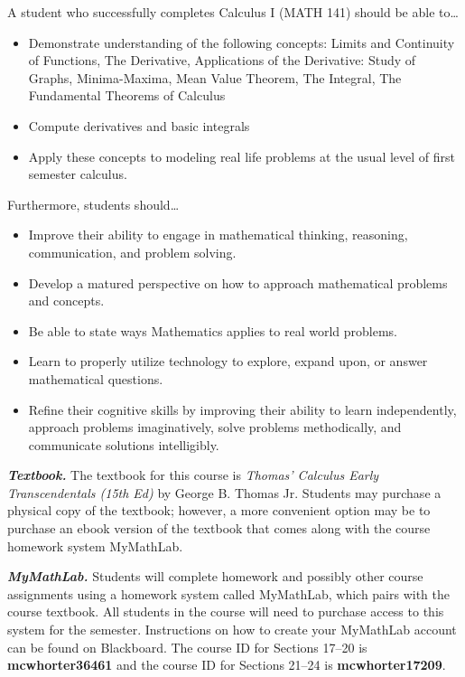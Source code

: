 \documentclass[11pt,letterpaper]{article}
\begin{document}
A student who successfully completes Calculus I (MATH 141) should be able to\dots
	\begin{itemize} \itemsep=0.3ex
	\item Demonstrate understanding of the following concepts: Limits and Continuity of Functions, The Derivative, Applications of the Derivative: Study of Graphs, Minima-Maxima, Mean Value Theorem, The Integral, The Fundamental Theorems of Calculus
	\item Compute derivatives and basic integrals
	\item Apply these concepts to modeling real life problems at the usual level of first semester calculus.
	\end{itemize}
Furthermore, students should\dots
	\begin{itemize} \itemsep=0.3ex
	\item  Improve their ability to engage in mathematical thinking, reasoning, communication, and problem solving.
	\item Develop a matured perspective on how to approach mathematical problems and concepts.
	\item Be able to state ways Mathematics applies to real world problems.
	\item Learn to properly utilize technology to explore, expand upon, or answer mathematical questions.
	\item Refine their cognitive skills by improving their ability to learn independently, approach problems imaginatively, solve problems methodically, and communicate solutions intelligibly.
	\end{itemize}
\sectionbreak





\newpage






{\itshape\bfseries\color{scred}Textbook.} The textbook for this course is {\itshape Thomas' Calculus Early Transcendentals (15th Ed)} by George B. Thomas Jr. Students may purchase a physical copy of the textbook; however, a more convenient option may be to purchase an ebook version of the textbook that comes along with the course homework system MyMathLab. \pspace

{\itshape\bfseries\color{scred}MyMathLab.} Students will complete homework and possibly other course assignments using a homework system called MyMathLab, which pairs with the course textbook. All students in the course will need to purchase access to this system for the semester. Instructions on how to create your MyMathLab account can be found on Blackboard. The course ID for Sections 17--20 is \textbf{mcwhorter36461} and the course ID for Sections 21--24 is \textbf{mcwhorter17209}. \pspace
\end{document}
